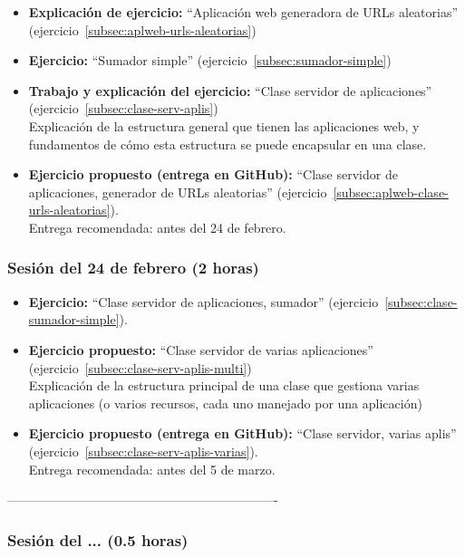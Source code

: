 \documentclass[a4paper,12pt]{article}
\begin{document}
\begin{itemize}
 \item \textbf{Explicación de ejercicio:} ``Aplicación web generadora de URLs aleatorias'' (ejercicio~\ref{subsec:aplweb-urls-aleatorias})
 \item \textbf{Ejercicio:} ``Sumador simple'' (ejercicio~\ref{subsec:sumador-simple}) \\
 \item \textbf{Trabajo y explicación del ejercicio:} ``Clase servidor de aplicaciones'' (ejercicio~\ref{subsec:clase-serv-aplis}) \\
   Explicación de la estructura general que tienen las aplicaciones web, y fundamentos de cómo esta estructura se puede encapsular en una clase.
 \item \textbf{Ejercicio propuesto (entrega en GitHub):} ``Clase servidor de aplicaciones, generador de URLs aleatorias'' (ejercicio~\ref{subsec:aplweb-clase-urls-aleatorias}). \\
   Entrega recomendada: antes del 24 de febrero.
\end{itemize}

\subsubsection{Sesión del 24 de febrero (2 horas)}

\begin{itemize}
 \item \textbf{Ejercicio:} ``Clase servidor de aplicaciones, sumador'' (ejercicio~\ref{subsec:clase-sumador-simple}). 
 \item \textbf{Ejercicio propuesto:}  ``Clase servidor de varias aplicaciones'' (ejercicio~\ref{subsec:clase-serv-aplis-multi}) \\
   Explicación de la estructura principal de una clase que gestiona varias aplicaciones (o varios recursos, cada uno manejado por una aplicación)
 \item \textbf{Ejercicio propuesto (entrega en GitHub):} ``Clase servidor, varias aplis'' (ejercicio~\ref{subsec:clase-serv-aplis-varias}). \\
   Entrega recomendada: antes del 5 de marzo.
\end{itemize}

----------------------------------------------------------------
\subsubsection{Sesión del ... (0.5 horas)}
\end{document}
